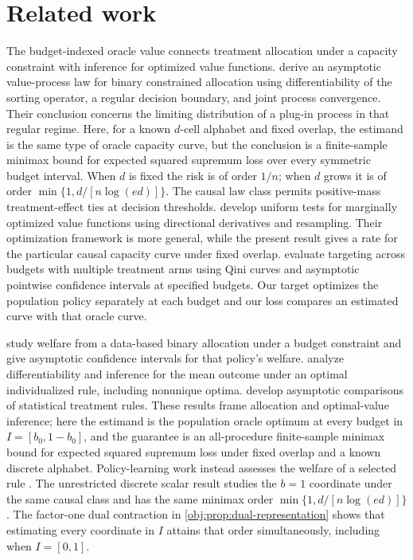 \documentclass[11pt]{article}
\begin{document}
\section{Related work}

The budget-indexed oracle value connects treatment allocation under a capacity constraint with inference for optimized value functions. \citet[Assumptions 4.1.1--4.1.3 and Theorem 4.1.1]{FengHongNekipelov2026} derive an asymptotic value-process law for binary constrained allocation using differentiability of the sorting operator, a regular decision boundary, and joint process convergence. Their conclusion concerns the limiting distribution of a plug-in process in that regular regime. Here, for a known \(d\)-cell alphabet and fixed overlap, the estimand is the same type of oracle capacity curve, but the conclusion is a finite-sample minimax bound for expected squared supremum loss over every symmetric budget interval. When \(d\) is fixed the risk is of order \(1/n\); when \(d\) grows it is of order \(\min\{1,d/[n\log(ed)]\}\). The causal law class permits positive-mass treatment-effect ties at decision thresholds. \citet[Section~4]{FirpoGalvaoParker2023} develop uniform tests for marginally optimized value functions using directional derivatives and resampling. Their optimization framework is more general, while the present result gives a rate for the particular causal capacity curve under fixed overlap. \citet[Sections~3.1 and~5]{SverdrupWuAtheyWager2025} evaluate targeting across budgets with multiple treatment arms using Qini curves and asymptotic pointwise confidence intervals at specified budgets. Our target optimizes the population policy separately at each budget and our loss compares an estimated curve with that oracle curve.

\citet[Section~5]{BhattacharyaDupas2012} study welfare from a data-based binary allocation under a budget constraint and give asymptotic confidence intervals for that policy's welfare. \citet[Sections~3 and~5]{LuedtkeVanDerLaan2016} analyze differentiability and inference for the mean outcome under an optimal individualized rule, including nonunique optima. \citet[Introduction]{Hirano2009} develop asymptotic comparisons of statistical treatment rules. These results frame allocation and optimal-value inference; here the estimand is the population oracle optimum at every budget in \(I=[b_0,1-b_0]\), and the guarantee is an all-procedure finite-sample minimax bound for expected squared supremum loss under fixed overlap and a known discrete alphabet. Policy-learning work instead assesses the welfare of a selected rule \citep{KitagawaTetenov2018,AtheyWager2021,Pellatt2023}. The unrestricted discrete scalar result \citep{CausalSmithUnrestricted2026} studies the \(b=1\) coordinate under the same causal class and has the same minimax order \(\min\{1,d/[n\log(ed)]\}\). The factor-one dual contraction in \cref{obj:prop:dual-representation} shows that estimating every coordinate in \(I\) attains that order simultaneously, including when \(I=[0,1]\).
\end{document}
